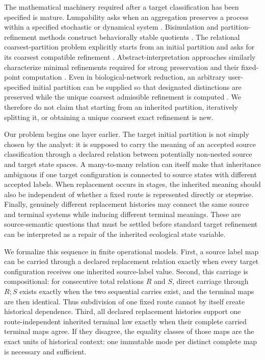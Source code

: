 \documentclass[11pt]{article}
\begin{document}
The mathematical machinery required after a target classification has been specified is mature. Lumpability asks when an aggregation preserves a process within a specified stochastic or dynamical system \citep{KemenySnell1960,FeretEtAl2012}. Bisimulation and partition-refinement methods construct behaviorally stable quotients \citep{Milner1989,LarsenSkou1991,PaigeTarjan1987}. The relational coarsest-partition problem explicitly starts from an initial partition and asks for its coarsest compatible refinement \citep{Fernandez1990}. Abstract-interpretation approaches similarly characterize minimal refinements required for strong preservation and their fixed-point computation \citep{RanzatoTapparo2007}. Even in biological-network reduction, an arbitrary user-specified initial partition can be supplied so that designated distinctions are preserved while the unique coarsest admissible refinement is computed \citep{ArgyrisEtAl2023}. We therefore do not claim that starting from an inherited partition, iteratively splitting it, or obtaining a unique coarsest exact refinement is new.

Our problem begins one layer earlier. The target initial partition is not simply chosen by the analyst: it is supposed to carry the meaning of an accepted source classification through a declared relation between potentially non-nested source and target state spaces. A many-to-many relation can itself make that inheritance ambiguous if one target configuration is connected to source states with different accepted labels. When replacement occurs in stages, the inherited meaning should also be independent of whether a fixed route is represented directly or stepwise. Finally, genuinely different replacement histories may connect the same source and terminal systems while inducing different terminal meanings. These are source-semantic questions that must be settled before standard target refinement can be interpreted as a repair of the inherited ecological state variable.

We formalize this sequence in finite operational models. First, a source label map can be carried through a declared replacement relation exactly when every target configuration receives one inherited source-label value. Second, this carriage is compositional: for consecutive total relations $R$ and $S$, direct carriage through $R;S$ exists exactly when the two sequential carries exist, and the terminal maps are then identical. Thus subdivision of one fixed route cannot by itself create historical dependence. Third, all declared replacement histories support one route-independent inherited terminal law exactly when their complete carried terminal maps agree. If they disagree, the equality classes of those maps are the exact units of historical context: one immutable mode per distinct complete map is necessary and sufficient.
\end{document}
